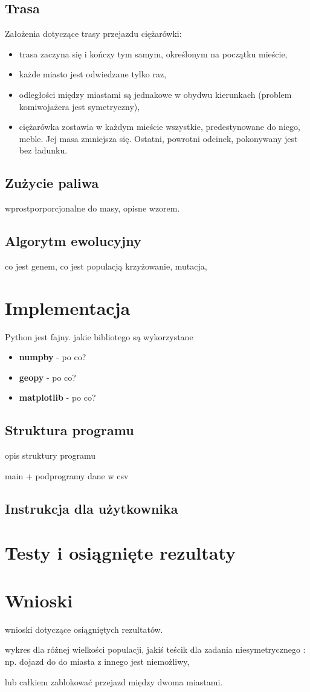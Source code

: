\documentclass[11pt,a4paper]{article}
\begin{document}
\subsection{Trasa}
Założenia dotyczące trasy przejazdu ciężarówki:
\begin{itemize}
\item trasa zaczyna się i kończy tym samym, określonym na początku mieście,
\item każde miasto jest odwiedzane tylko raz,
\item odległości między miastami są jednakowe w obydwu kierunkach (problem komiwojażera jest symetryczny),
\item ciężarówka zostawia w każdym mieście wszystkie, predestynowane do niego, meble. Jej masa zmniejsza się. Ostatni, powrotni odcinek, pokonywany jest bez ładunku.
\end{itemize}

\subsection{Zużycie paliwa}
wprostporporcjonalne do masy, opisne wzorem.

\subsection{Algorytm ewolucyjny}
co jest genem,
co jest populacją
krzyżowanie,
mutacja,


\section{Implementacja}
Python jest fajny. jakie bibliotego są wykorzystane
\begin{itemize}
\item \textbf{numpby} - po co?
\item \textbf{geopy} - po co?
\item \textbf{matplotlib} - po co?
\end{itemize}

\subsection{Struktura programu}
opis struktury programu

main + podprogramy
dane w csv

\subsection{Instrukcja dla użytkownika}

\section{Testy i osiągnięte rezultaty}

\section{Wnioski}
wnioski dotyczące osiągniętych rezultatów. 

wykres dla różnej wielkości populacji,
jakiś teścik dla zadania niesymetrycznego : np. dojazd do do miasta z innego jest niemożliwy,

lub całkiem zablokować przejazd między dwoma miastami.
\end{document}
